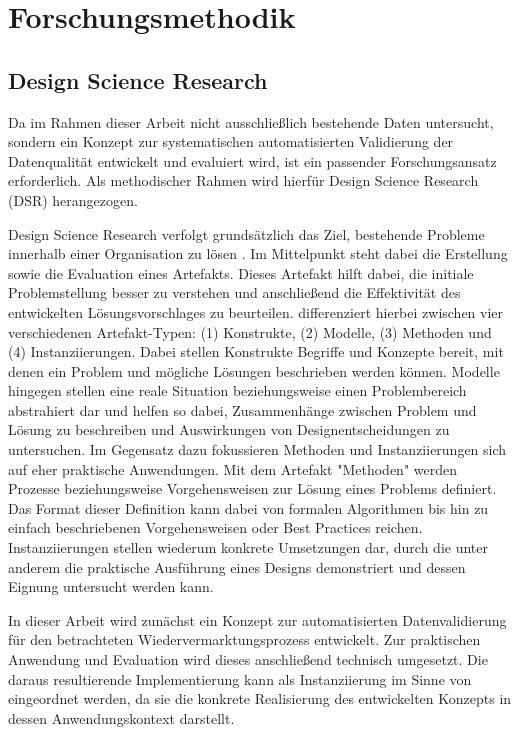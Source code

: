 \documentclass[../main.tex]{subfiles}
\begin{document}
\chapter{Forschungsmethodik}
\label{chap:Forschungsmethodik}

\section{Design Science Research}

Da im Rahmen dieser Arbeit nicht ausschließlich bestehende Daten untersucht, sondern ein Konzept zur systematischen automatisierten Validierung der Datenqualität entwickelt und evaluiert wird, ist ein passender Forschungsansatz erforderlich. Als methodischer Rahmen wird hierfür Design Science Research (DSR) herangezogen.

Design Science Research verfolgt grundsätzlich das Ziel, bestehende Probleme innerhalb einer Organisation zu lösen \parencite{hevnerDsr}. Im Mittelpunkt steht dabei die Erstellung sowie die Evaluation eines Artefakts. Dieses Artefakt hilft dabei, die initiale Problemstellung besser zu verstehen und anschließend die Effektivität des entwickelten Lösungsvorschlages zu beurteilen.
\textcite{hevnerDsr} differenziert hierbei zwischen vier verschiedenen Artefakt-Typen: (1) Konstrukte, (2) Modelle, (3) Methoden und (4) Instanziierungen. Dabei stellen Konstrukte Begriffe und Konzepte bereit, mit denen ein Problem und mögliche Lösungen beschrieben werden können. Modelle hingegen stellen eine reale Situation beziehungsweise einen Problembereich abstrahiert dar und helfen so dabei, Zusammenhänge zwischen Problem und Lösung zu beschreiben und Auswirkungen von Designentscheidungen zu untersuchen. Im Gegensatz dazu fokussieren Methoden und Instanziierungen sich auf eher praktische Anwendungen. Mit dem Artefakt "Methoden" werden Prozesse beziehungsweise Vorgehensweisen zur Lösung eines Problems definiert. Das Format dieser Definition kann dabei von formalen Algorithmen bis hin zu einfach beschriebenen Vorgehensweisen oder Best Practices reichen. Instanziierungen stellen wiederum konkrete Umsetzungen dar, durch die unter anderem die praktische Ausführung eines Designs demonstriert und dessen Eignung untersucht werden kann. 

In dieser Arbeit wird zunächst ein Konzept zur automatisierten Datenvalidierung für den betrachteten Wiedervermarktungsprozess entwickelt. Zur praktischen Anwendung und Evaluation wird dieses anschließend technisch umgesetzt. Die daraus resultierende Implementierung kann als Instanziierung im Sinne von \textcite{hevnerDsr} eingeordnet werden, da sie die konkrete Realisierung des entwickelten Konzepts in dessen Anwendungskontext darstellt.
\end{document}
